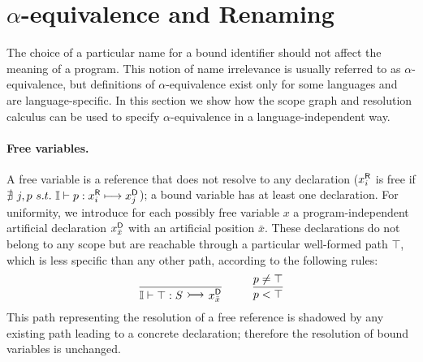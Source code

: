 \section{$\alpha$-equivalence and Renaming}

The choice of a particular name for a bound identifier should not affect the meaning of a program. 
This notion of name irrelevance is usually referred to as $\alpha$-equivalence, 
but definitions of $\alpha$-equivalence exist only for some languages and are
language-specific.
In this section we show how the scope graph and resolution calculus can be used to 
specify $\alpha$-equivalence in a language-independent way.


\paragraph{Free variables.}
A free variable is a reference that does not resolve to any declaration (${x}^{\mbox{\scriptsize\sf R}}_{i}$ is free if $\nexists\ j,p\ s.t.\ \mathbb{I} \vdash p : {x}^{\mbox{\scriptsize\sf R}}_{i} \longmapsto {x}^{\mbox{\scriptsize\sf D}}_{j}$); 
a bound variable has at least one declaration.
For uniformity, we introduce for each possibly free variable $x$ a program-independent artificial declaration ${x}^{\mbox{\scriptsize\sf D}}_{\bar{x}}$ with an artificial position $\bar{x}$. These declarations do not belong to any scope but are reachable through a particular well-formed path $\top$, which is less specific than any other path, according to the following rules:\vspace*{-.6\baselineskip}
$$ \infrulenl{}{\seeni \vdash \top : S \reach \di{x}{\bar{x}}}\tab\tab\tab
\infrulenl{p \neq \top}{p < \top} $$
This path representing the resolution of a free reference is shadowed by any existing path leading to a concrete declaration; therefore the resolution of bound variables is unchanged. 

